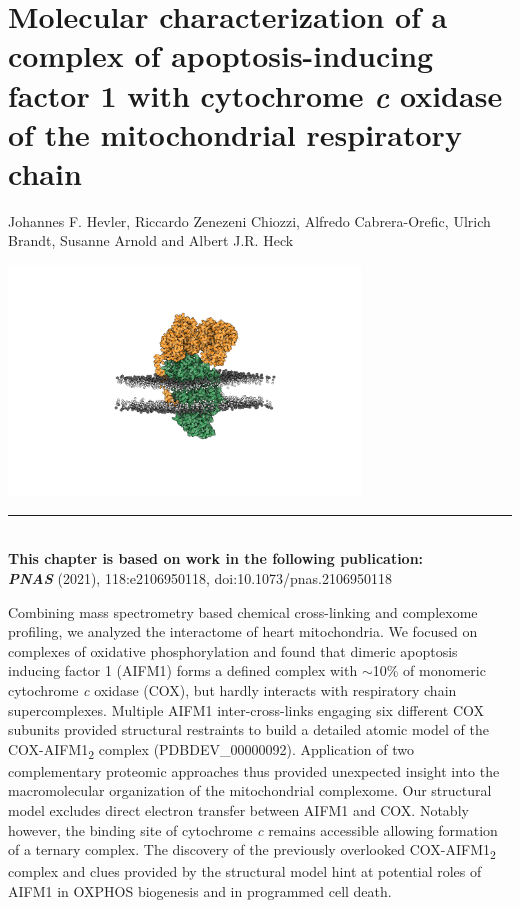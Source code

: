 \chapter{\large Molecular characterization of a complex of apoptosis-inducing factor 1 with cytochrome \emph{c} oxidase of the mitochondrial respiratory chain}\label{ch-3}
\vspace*{-1cm}
\footnotesize Johannes F. Hevler, Riccardo Zenezeni Chiozzi, Alfredo Cabrera-Orefic, Ulrich Brandt, Susanne Arnold and Albert J.R. Heck
%
\begin{center}
    \vspace{1.125cm}
    \includegraphics[width=0.7\textwidth]{Chapter.3/Figures/COX_AIFM1_Goodshell_like.png}
    \vspace{0.25cm}
\end{center}
%
\begin{flushleft}
    \vspace*{\fill}
    \rule{\textwidth}{1pt}\\[0cm]
    \textbf{This chapter is based on work in the following publication:}\\
    \footnotesize
    \textbf{\emph{PNAS}} (2021), 118:e2106950118, doi:10.1073/pnas.2106950118\\
    \footnotesize
\end{flushleft}
\begin{abstract102}
    Combining mass spectrometry based chemical cross-linking and complexome profiling, we analyzed the interactome of heart mitochondria. We focused on complexes of oxidative phosphorylation and found that dimeric apoptosis inducing factor 1 (AIFM1) forms a defined complex with $\sim$10\% of monomeric cytochrome \emph{c} oxidase (COX), but hardly interacts with respiratory chain supercomplexes. Multiple AIFM1 inter-cross-links engaging six different COX subunits provided structural restraints to build a detailed atomic model of the COX-AIFM1\textsubscript{2} complex (PDBDEV\_00000092). Application of two complementary proteomic approaches thus provided unexpected insight into the macromolecular organization of the mitochondrial complexome. Our structural model excludes direct electron transfer between AIFM1 and COX. Notably however, the binding site of cytochrome \emph{c} remains accessible allowing formation of a ternary complex. The discovery of the previously overlooked COX-AIFM1\textsubscript{2} complex and clues provided by the structural model hint at potential roles of AIFM1 in OXPHOS biogenesis and in programmed cell death.
\end{abstract102}
